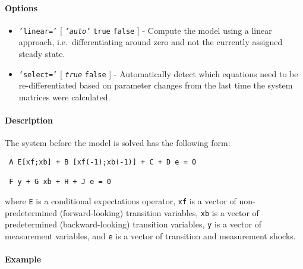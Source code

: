  \paragraph{Options}
 
 \begin{itemize}
 \item
   \texttt{'linear='} {[} \emph{\texttt{'auto'}} \textbar{} \texttt{true}
   \textbar{} \texttt{false} {]} - Compute the model using a linear
   approach, i.e.~differentiating around zero and not the currently
   assigned steady state.
 \item
   \texttt{'select='} {[} \emph{\texttt{true}} \textbar{} \texttt{false}
   {]} - Automatically detect which equations need to be
   re-differentiated based on parameter changes from the last time the
   system matrices were calculated.
 \end{itemize}
 
 \paragraph{Description}
 
 The system before the model is solved has the following form:
 
 \begin{verbatim}
 A E[xf;xb] + B [xf(-1);xb(-1)] + C + D e = 0
 
 F y + G xb + H + J e = 0
 \end{verbatim}
 
 where \texttt{E} is a conditional expectations operator, \texttt{xf} is
 a vector of non-predetermined (forward-looking) transition variables,
 \texttt{xb} is a vector of predetermined (backward-looking) transition
 variables, \texttt{y} is a vector of measurement variables, and
 \texttt{e} is a vector of transition and measurement shocks.
 
 \paragraph{Example}


